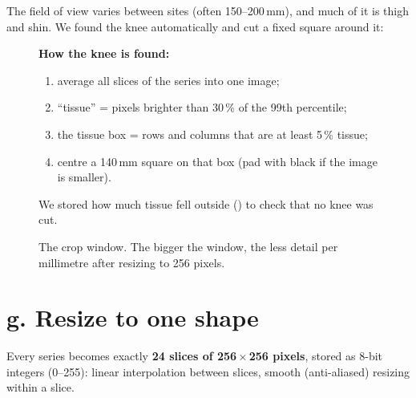 The field of view varies between sites (often 150--200\,mm), and much of it is thigh and shin. We found the knee
automatically and cut a fixed square around it:

\begin{figure}[H]
\centering
{}\hspace{6mm}
\begin{minipage}[b]{0.42\linewidth}\small
\textbf{How the knee is found:}
\begin{enumerate}
\item average all slices of the series into one image;
\item ``tissue'' = pixels brighter than 30\,\% of the 99th percentile;
\item the tissue box = rows and columns that are at least 5\,\% tissue;
\item centre a 140\,mm square on that box (pad with black if the image is smaller).
\end{enumerate}
We stored how much tissue fell outside () to check that no knee was cut.\par\medskip
\end{minipage}
\caption{The crop window. The bigger the window, the less detail per millimetre after resizing to 256 pixels.}
\label{fig:crop}
\end{figure}

\section{g. Resize to one shape}

Every series becomes exactly \textbf{24 slices of 256\,$\times$\,256 pixels}, stored as 8-bit integers (0--255):
linear interpolation between slices, smooth (anti-aliased) resizing within a slice.

